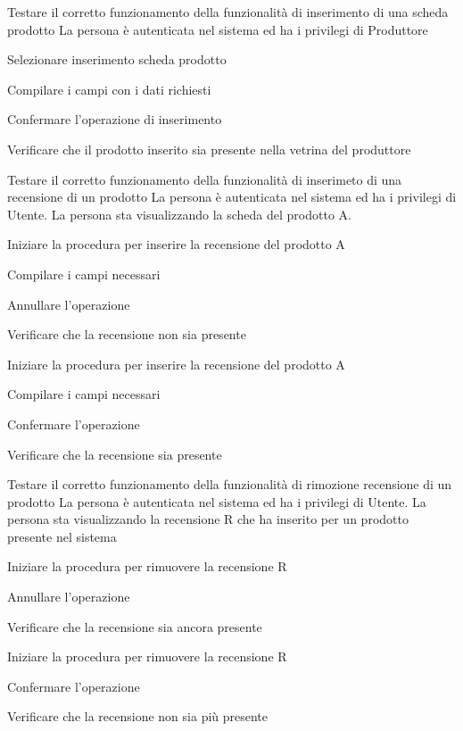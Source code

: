{Testare il corretto funzionamento della funzionalità di inserimento di una scheda prodotto}
{La persona è autenticata nel sistema ed ha i privilegi di Produttore}
{\begin{enumCU}
    \item Selezionare inserimento scheda prodotto
    \item Compilare i campi con i dati richiesti
    \item Confermare l'operazione di inserimento
    \item Verificare che il prodotto inserito sia presente nella vetrina del produttore
\end{enumCU}}


{Testare il corretto funzionamento della funzionalità di inserimeto di una recensione di un prodotto}
{La persona è autenticata nel sistema ed ha i privilegi di Utente. La persona sta visualizzando la scheda del prodotto A.}
{\begin{enumCU}
	\item Iniziare la procedura per inserire la recensione del prodotto A
	\item Compilare i campi necessari
	\item Annullare l'operazione
	\item Verificare che la recensione non sia presente
	\item Iniziare la procedura per inserire la recensione del prodotto A
	\item Compilare i campi necessari
	\item Confermare l'operazione
	\item Verificare che la recensione sia presente
\end{enumCU}}


{Testare il corretto funzionamento della funzionalità di rimozione recensione di un prodotto}
{La persona è autenticata nel sistema ed ha i privilegi di Utente. La persona sta visualizzando la recensione R che ha inserito per un prodotto presente nel sistema}
{\begin{enumCU}
	\item Iniziare la procedura per rimuovere la recensione R
	\item Annullare l'operazione
	\item Verificare che la recensione sia ancora presente
	\item Iniziare la procedura per rimuovere la recensione R
	\item Confermare l'operazione
	\item Verificare che la recensione non sia più presente
\end{enumCU}}


